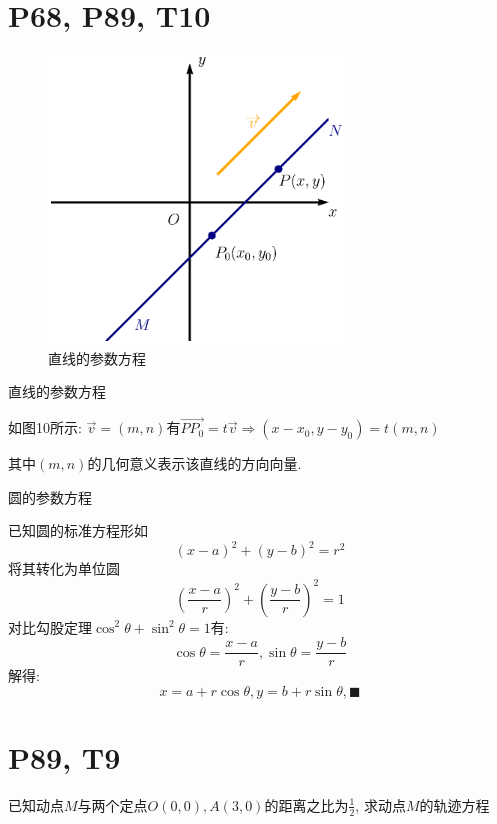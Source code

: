 \documentclass{book}
\begin{document}
    \section{\textcolor[rgb]{0.11,0.65,0.52}{P68, P89, T10}}
    \begin{figure}[htbp]
        \centering
        \includegraphics[width=0.7\textwidth]{img/ArgumentFunctions.eps}
        \caption{直线的参数方程}
    \end{figure}
    \textcolor[rgb]{0.38,0.11,0.2}{直线的参数方程}

    如图10所示: $\overrightarrow{v}=\left( m, n \right)$有$\overrightarrow{PP_0}=t\overrightarrow{v}\Longrightarrow  \left( x-x_0, y-y_0 \right)=t\left( m,n \right)$

    其中$(m,n)$的几何意义表示该直线的方向向量.

    \textcolor[rgb]{0.38,0.11,0.2}{圆的参数方程}

    已知圆的标准方程形如$$\displaystyle \left( x-a \right)^2+\left( y-b \right)^2=r^2$$
    将其转化为\textcolor[rgb]{0.75,0.17,0.22}{单位圆}$$\left( \frac{x-a}{r} \right)^2+\left( \frac{y-b}{r} \right)^2=1$$
    \textcolor[rgb]{0.75,0.17,0.22}{对比勾股定理}$\cos^2\theta +\sin^2\theta=1$有:
    $$\cos \theta =\frac{x-a}{r},\sin \theta=\frac{y-b}{r}$$
    解得:$$x=a+r\cos \theta,y=b+r\sin \theta, \blacksquare$$

    \section{\textcolor[rgb]{0.11,0.65,0.52}{P89, T9}}

    \begin{boxB}
        已知动点$M$与两个定点$O\left( 0,0 \right),A\left( 3,0 \right)$的距离之比为$\displaystyle \frac{1}{2}$, 求动点$M$的轨迹方程
    \end{boxB}
\end{document}

